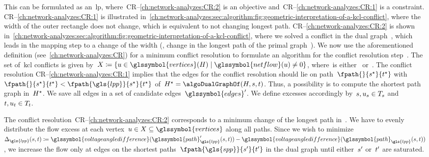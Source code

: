 This can be formulated as an~\gls{lp}, where~CR--\ref{ch:network-analyzes:CR:2}
is an objective and~CR--\ref{ch:network-analyzes:CR:1} is a constraint.
CR--\ref{ch:network-analyzes:CR:1} is illustrated
in~\cref{ch:network-analyzes:sec:algorithm:fig:geometric-interpretation-of-a-kcl-conflict},
where the width of the outer rectangle does not change, which is equivalent to
not changing longest path. CR--\ref{ch:network-analyzes:CR:2} is shown
in~\cref{ch:network-analyzes:sec:algorithm:fig:geometric-interpretation-of-a-kcl-conflict},
where we solved a conflict in the dual graph~, which leads
in the mapping step to a change of the width (\ie, change in the longest path of
the primal graph~).
% 
We now use the aforementioned definition (see~\cref{ch:network-analyzes:CR}) for
a minimum conflict resolution to formulate an algorithm for the conflict
resolution step~. The set
of~\gls{kcl} conflicts is given by~$
    \excessSet 
    \coloneqq 
    \{
        \vertexa
        \in
        \glssymbol{vertices}(\subgraph)
        \mid
        \glssymbol{netflow}(\vertexa)
        \neq 
        0
    \}
$, where~\subgraph is either~ or~. The
conflict resolution CR--\ref{ch:network-analyzes:CR:1} implies that the edges
for the conflict resolution should lie on
path~$
    \fpath{ }{\source^\star}{\sink^\star}
$ with~$
    \fpath{ }{\source^\star}{\sink^\star} 
    < 
    \fpath{ \gls{lpp} }{\source^\star}{\sink^\star}
$ of~$
    \subgraph^{\star} 
    =
    \algoDualGraphOf(\subgraph, \source, \sink)
$. Thus, a possibility is to compute the shortest path graph
in~$H^\star$. We save all edges in a set of candidate
edges~$\glssymbol{edges}'$.
% 
% 
We define excesses accordingly by~$
    s, 
    u_{s} 
    \in 
    T_{s}
$ and~$
    t, 
    u_{t} 
    \in
    T_{t}
$.

The conflict resolution~CR--\ref{ch:network-analyzes:CR:2} corresponds to a
minimum change of the longest path in~\subgraph. We have to evenly distribute
the flow excess at each vertex~$
    \vertexa
    \in
    \excessSet
    \subseteq
    \glssymbol{vertices}
$ along all paths. Since we wish to minimize~$
    \Delta_{\gls{lpp}}(\source,\sink)
    \coloneqq
    \glssymbol{voltageangledifference}(\glssymbol{path}_{\gls{lpp}}'(\source,\sink))
    -
    \glssymbol{voltageangledifference}(\glssymbol{path}_{\gls{lpp}}(\source,\sink))
$, we increase the flow only at edges on the shortest paths~$
    \fpath{\gls{spp}}{\source'}{\sink'}
$ in the dual graph until either~$s'$ or~$t'$ are saturated.

